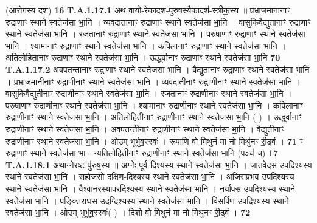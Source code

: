 \documentclass[17pt]{extarticle}
\begin{document}
                  \newline
                                                        (आरोगस्य दश॑) \textbf{16} \newline \newline
                                \textbf{ T.A.1.17.1} \newline
                  अथ वायो-रेकादश-पुरुषस्यैकादश॑-स्त्रीक॒स्य ॥ प्रभ्राजमानानाꣳ रुद्राणाꣳ स्थाने स्वतेज॑सा भा॒नि ।  व्यवदातानाꣳ रुद्राणाꣳ स्थाने स्वतेज॑सा भा॒नि ।  वासुकिवैद्युतानाꣳ रुद्राणाꣳ स्थाने स्वतेज॑सा भा॒नि ।  रजतानाꣳ रुद्राणाꣳ स्थाने स्वतेज॑सा भा॒नि ।  परुषाणाꣳ रुद्राणाꣳ स्थाने स्वतेज॑सा भा॒नि ।  श्यामानाꣳ रुद्राणाꣳ स्थाने स्वतेज॑सा भा॒नि ।  कपिलानाꣳ रुद्राणाꣳ स्थाने स्वतेज॑सा भा॒नि ।  अतिलोहितानाꣳ रुद्राणाꣳ स्थाने स्वतेज॑सा भा॒नि ।  ऊर्द्ध्वानाꣳ रुद्राणाꣳ स्थाने स्वतेज॑सा भा॒नि \textbf{ 70} \newline
                  \newline
                                                                  \textbf{ T.A.1.17.2} \newline
                  अवपतन्तानाꣳ रुद्राणाꣳ स्थाने स्वतेज॑सा भा॒नि ।  वैद्युतानाꣳ रुद्राणाꣳ स्थाने स्वतेज॑सा भा॒नि ।  प्रभ्राजमानीनाꣳ रुद्राणीनाꣳ स्थाने स्वतेज॑सा भा॒नि ।  व्यवदातीनाꣳ रुद्राणीनाꣳ स्थाने स्वतेज॑सा भा॒नि ।  वासुकिवैद्युतीनाꣳ रुद्राणीनाꣳ स्थाने स्वतेज॑सा भा॒नि ।  रजतानाꣳ रुद्राणीनाꣳ स्थाने स्वतेज॑सा भा॒नि ।  परुषाणाꣳ रुद्राणीनाꣳ स्थाने स्वतेज॑सा भा॒नि ।  श्यामानाꣳ रुद्राणीनाꣳ स्थाने स्वतेज॑सा भा॒नि ।  कपिलानाꣳ रुद्राणीनाꣳ स्थाने स्वतेज॑सा भा॒नि ।  अतिलोहितीनाꣳ रुद्राणीनाꣳ स्थाने स्वतेज॑सा भा॒नि ( ) ।  ऊर्द्ध्वानाꣳ रुद्राणीनाꣳ स्थाने स्वतेज॑सा भा॒नि ।  अवपतन्तीनाꣳ रुद्राणीनाꣳ स्थाने स्वतेज॑सा भा॒नि ।  वैद्युतीनाꣳ रुद्राणीनाꣳ स्थाने स्वतेज॑सा भा॒नि ।  ओउम् भूर्भुव॒स्स्वः॑ ।  रूपाणि वो मिथुनं मा नो मिथु॑नꣳ री॒ढ्वं । \textbf{ 71} \newline
                  \newline
                                                        ꣳ रुद्राणाꣳ स्थाने स्वतेज॑सा भा॒ - न्यतिलोहितीनाꣳ रुद्राणीनाꣳ स्थाने स्वतेज॑सा भा॒नि (पञ्च॑ च) \textbf{17} \newline \newline
                                \textbf{ T.A.1.18.1} \newline
                  अथाग्ने॑रष्ट पु॑रुष॒स्य ॥ अग्नेः पूर्व-दिश्यस्य स्थाने स्वतेज॑सा भा॒नि ।  जातवेदस उपदिश्यस्य स्थाने स्वतेज॑सा भा॒नि ।  सहोजसो दक्षिण-दिश्यस्य स्थाने स्वतेज॑सा भा॒नि ।  अजिराप्रभव उपदिश्यस्य स्थाने स्वतेज॑सा भा॒नि ।  वैश्वानरस्यापरदिश्यस्य स्थाने स्वतेज॑सा भा॒नि ।  नर्यापस उपदिश्यस्य स्थाने स्वतेज॑सा भा॒नि ।  पङ्क्तिराधस उदग्दिश्यस्य स्थाने स्वतेज॑सा भा॒नि ।  विसर्पिण उपदिश्यस्य स्थाने स्वतेज॑सा भा॒नि ।  ओउम् भूर्भुव॒स्स्वः॑( ) । दिशो वो मिथुनं मा नो मिथु॑नꣳ री॒ढ्वं । \textbf{ 72} \newline
                  \newline
                                                  
\end{document}
